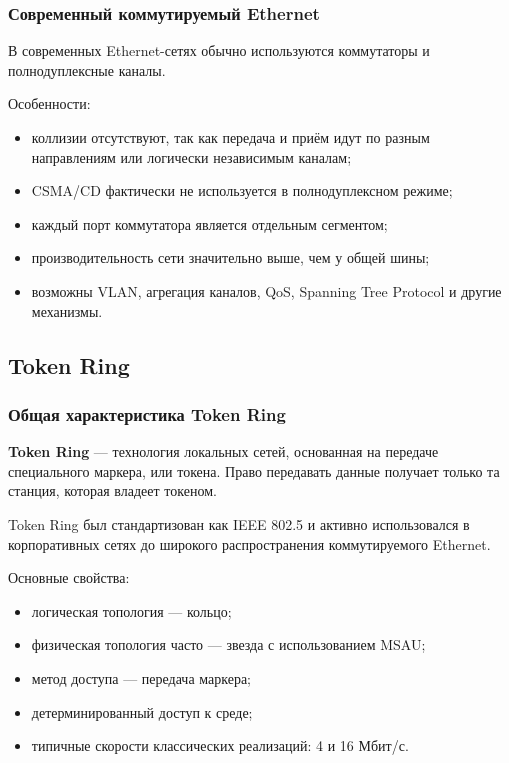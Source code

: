 \documentclass[12pt,a4paper]{article}
\begin{document}
\subsubsection{Современный коммутируемый Ethernet}

В современных Ethernet-сетях обычно используются коммутаторы и полнодуплексные каналы.

Особенности:
\begin{itemize}
    \item коллизии отсутствуют, так как передача и приём идут по разным направлениям или логически независимым каналам;
    \item CSMA/CD фактически не используется в полнодуплексном режиме;
    \item каждый порт коммутатора является отдельным сегментом;
    \item производительность сети значительно выше, чем у общей шины;
    \item возможны VLAN, агрегация каналов, QoS, Spanning Tree Protocol и другие механизмы.
\end{itemize}

\subsection{Token Ring}

\subsubsection{Общая характеристика Token Ring}

\textbf{Token Ring} --- технология локальных сетей, основанная на передаче специального маркера, или токена. Право передавать данные получает только та станция, которая владеет токеном.

Token Ring был стандартизован как IEEE 802.5 и активно использовался в корпоративных сетях до широкого распространения коммутируемого Ethernet.

Основные свойства:
\begin{itemize}
    \item логическая топология --- кольцо;
    \item физическая топология часто --- звезда с использованием MSAU;
    \item метод доступа --- передача маркера;
    \item детерминированный доступ к среде;
    \item типичные скорости классических реализаций: 4 и 16 Мбит/с.
\end{itemize}
\end{document}
